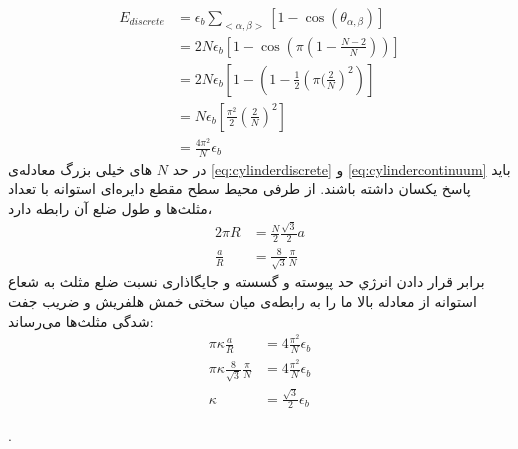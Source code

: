 \begin{equation}
\begin{aligned}
E_{discrete}&=\epsilon_b\sum_{<\alpha,\beta>}\left[1-\cos(\theta_{\alpha,\beta})\right]\\
&=2N\epsilon_b\left[1-\cos\left(\pi(1-\frac{N-2}{N})\right)\right]\\
&=2N\epsilon_b\left[1-\left(1-\frac{1}{2}\left(\pi(\frac{2}{N}\right)^2\right)\right]\\
&=N\epsilon_b\left[\frac{\pi^2}{2}\left(\frac{2}{N}\right)^2\right]\\
&=\frac{4\pi^2}{N}\epsilon_b
\end{aligned}
\label{eq:cylinderdiscrete}
\end{equation} 
در حد 
$N$
های خیلی بزرگ معادله‌ی 
\ref{eq:cylinderdiscrete}
 و 
\ref{eq:cylindercontinuum}
باید پاسخ یکسان داشته باشند. از طرفی محیط سطح مقطع دایره‌ای استوانه با تعداد مثلث‌ها و طول ضلع آن رابطه دارد،
\begin{equation}
\begin{aligned}
2 \pi R &= \frac{N}{2}\frac{\sqrt3}{2}a\\
\frac{a}{R}&=\frac{8}{\sqrt3}\frac{\pi}{N}
\end{aligned}
\label{eq:cylinderdiscretisation}
\end{equation} 
برابر قرار دادن انرژي حد پیوسته و گسسته و جایگاذاری نسبت ضلع مثلث به شعاع استوانه از معادله بالا ما را به رابطه‌ی میان سختی خمش هلفریش و ضریب جفت شدگی مثلث‌ها می‌رساند:
\begin{equation}
\begin{aligned}
\pi\kappa\frac{a}{R}&=4\frac{\pi^2}{N}\epsilon_b\\
\pi\kappa\frac{8}{\sqrt3}\frac{\pi}{N}&=4\frac{\pi^2}{N}\epsilon_b\\
\kappa&=\frac{\sqrt{3}}{2}\epsilon_b
\end{aligned}
\label{eq:epsilonkappa}
\end{equation} 




.
 
 
 
 
 
 
 
 
 
 
 
 
 
 
 